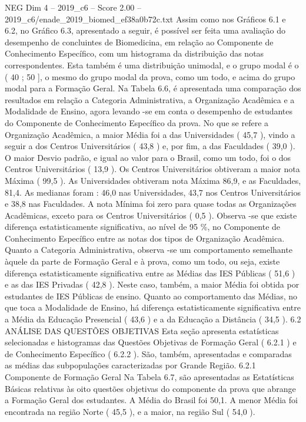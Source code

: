 \begin{textsample}{NEG Dim 4 – 2019\_c6 – Score 2.00 – 2019\_c6/enade\_2019\_biomed\_ef38a0b72c.txt}
Assim como nos Gráficos 6.1 e 6.2, no Gráfico 6.3, apresentado a seguir, é possível ser feita uma avaliação do desempenho de concluintes de Biomedicina, em relação ao Componente de Conhecimento Específico, com um histograma da distribuição das notas correspondentes.
Esta também é uma distribuição unimodal, e o grupo modal é o ( 40 ; 50 ], o mesmo do grupo modal da prova, como um todo, e acima do grupo modal para a Formação Geral.
Na Tabela 6.6, é apresentada uma comparação dos resultados em relação a Categoria Administrativa, a Organização Acadêmica e a Modalidade de Ensino, agora levando -se em conta o desempenho de estudantes do Componente de Conhecimento Específico da prova.
No que se refere a Organização Acadêmica, a maior Média foi a das Universidades ( 45,7 ), vindo a seguir a dos Centros Universitários ( 43,8 ) e, por fim, a das Faculdades ( 39,0 ).
O maior Desvio padrão, e igual ao valor para o Brasil, como um todo, foi o dos Centros Universitários ( 13,9 ).
Os Centros Universitários obtiveram a maior nota Máxima ( 99,5 ).
As Universidades obtiveram nota Máxima 86,9, e as Faculdades, 81,4.
As medianas foram : 46,0 nas Universidades, 43,7 nos Centros Universitários e 38,8 nas Faculdades.
A nota Mínima foi zero para quase todas as Organizações Acadêmicas, exceto para os Centros Universitários ( 0,5 ).
Observa -se que existe diferença estatisticamente significativa, ao nível de 95 \%, no Componente de Conhecimento Específico entre as notas dos tipos de Organização Acadêmica.
Quanto a Categoria Administrativa, observa -se um comportamento semelhante àquele da parte de Formação Geral e à prova, como um todo, ou seja, existe diferença estatisticamente significativa entre as Médias das IES Públicas ( 51,6 ) e as das IES Privadas ( 42,8 ).
Neste caso, também, a maior Média foi obtida por estudantes de IES Públicas de ensino.
Quanto ao comportamento das Médias, no que toca a Modalidade de Ensino, há diferença estatisticamente significativa entre a Média da Educação Presencial ( 43,6 ) e a da Educação a Distância ( 34,5 ). 6.2 ANÁLISE DAS QUESTÕES OBJETIVAS Esta seção apresenta estatísticas selecionadas e histogramas das Questões Objetivas de Formação Geral ( 6.2.1 ) e de Conhecimento Específico ( 6.2.2 ).
São, também, apresentadas e comparadas as médias das subpopulações caracterizadas por Grande Região. 6.2.1 Componente de Formação Geral Na Tabela 6.7, são apresentadas as Estatísticas Básicas relativas às oito questões objetivas do componente da prova que abrange a Formação Geral dos estudantes.
A Média do Brasil foi 50,1.
A menor Média foi encontrada na região Norte ( 45,5 ), e a maior, na região Sul ( 54,0 ).

\end{textsample}
